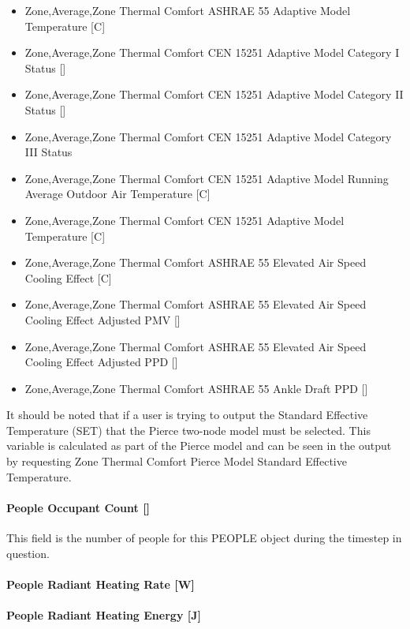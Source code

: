 \begin{itemize}
\item
  Zone,Average,Zone Thermal Comfort ASHRAE 55 Adaptive Model Temperature {[}C{]}
\item
  Zone,Average,Zone Thermal Comfort CEN 15251 Adaptive Model Category I Status {[]}
\item
  Zone,Average,Zone Thermal Comfort CEN 15251 Adaptive Model Category II Status {[]}
\item
  Zone,Average,Zone Thermal Comfort CEN 15251 Adaptive Model Category III Status
\item
  Zone,Average,Zone Thermal Comfort CEN 15251 Adaptive Model Running Average Outdoor Air Temperature {[}C{]}
\item
  Zone,Average,Zone Thermal Comfort CEN 15251 Adaptive Model Temperature {[}C{]}
\item
  Zone,Average,Zone Thermal Comfort ASHRAE 55 Elevated Air Speed Cooling Effect {[}C{]}
\item
  Zone,Average,Zone Thermal Comfort ASHRAE 55 Elevated Air Speed Cooling Effect Adjusted PMV {[]}
\item
  Zone,Average,Zone Thermal Comfort ASHRAE 55 Elevated Air Speed Cooling Effect Adjusted PPD {[]}
\item
  Zone,Average,Zone Thermal Comfort ASHRAE 55 Ankle Draft PPD {[]}
\end{itemize}

It should be noted that if a user is trying to output the Standard Effective Temperature (SET) that the Pierce two-node model must be selected.  This variable is calculated as part of the Pierce model and can be seen in the output by requesting Zone Thermal Comfort Pierce Model Standard Effective Temperature.

\paragraph{People Occupant Count {[]}}\label{people-occupant-count}

This field is the number of people for this PEOPLE object during the timestep in question.

\paragraph{People Radiant Heating Rate {[}W{]}}\label{people-radiant-heating-rate-w}

\paragraph{People Radiant Heating Energy {[}J{]}}\label{people-radiant-heating-energy-j}

